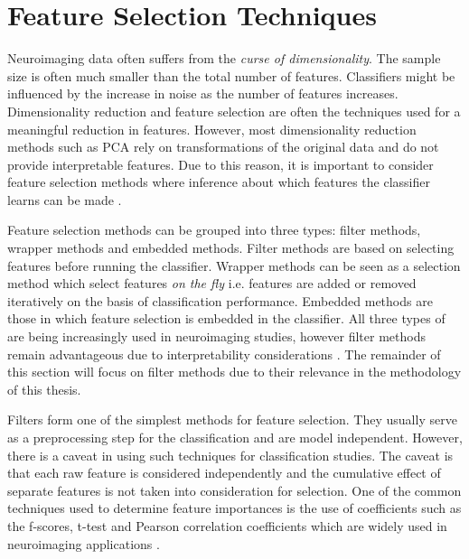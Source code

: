 \documentclass[msthesis.tex]{subfiles}
\begin{document}
\section{Feature Selection Techniques}
\vspace{-0.5em}
\label{sec:feature_selection}
Neuroimaging data often suffers from the \textit{curse of dimensionality}. The sample size is often much smaller than the total number of features. Classifiers might be influenced by the increase in noise as the number of features increases. Dimensionality reduction and feature selection are often the techniques used for a meaningful reduction in features. However, most dimensionality reduction methods such as \gls{PCA} rely on transformations of the original data and do not provide interpretable features. Due to this reason, it is important to consider feature selection methods where inference about which features the classifier learns can be made \citep{shi2018feature}.

Feature selection methods can be grouped into three types: filter methods, wrapper methods and embedded methods. Filter methods are based on selecting features before running the classifier. Wrapper methods can be seen as a selection method which select features \textit{on the fly} i.e. features are added or removed iteratively on the basis of classification performance. Embedded methods are those in which feature selection is embedded in the classifier. All three types of are being increasingly used in neuroimaging studies, however filter methods remain advantageous due to interpretability considerations \citep{tohka2016comparison}. The remainder of this section will focus on filter methods due to their relevance in the methodology of this thesis.

Filters form one of the simplest methods for feature selection. They usually serve as a preprocessing step for the classification and are model independent. However, there is a caveat in using such techniques for classification studies. The caveat is that each raw feature is considered independently and the cumulative effect of separate features is not taken into consideration for selection. One of the common techniques used to determine feature importances is the use of coefficients such as the f-scores, t-test and Pearson correlation coefficients which are widely used in neuroimaging applications \citep{mwangi2014review}.
\end{document}
